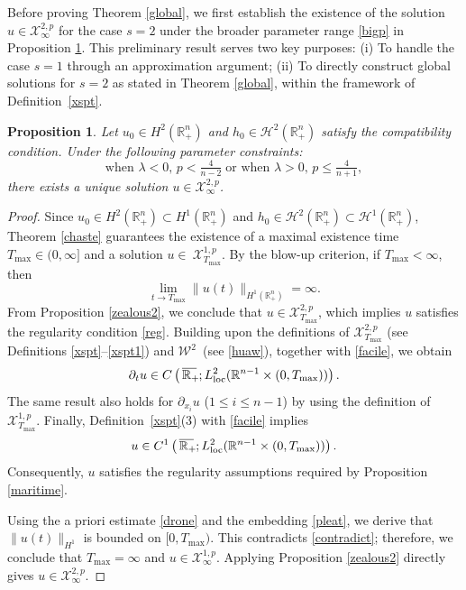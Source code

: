 \documentclass[preprint,compress,12pt]{elsarticle}
\newtheorem{proposition}[theorem]{Proposition}
\numberwithin{equation}{section}
\begin{document}
Before proving Theorem \ref{global}, we first establish the existence of the solution $u \in \mathscr{X}^{2,p}_\infty$ for the case $s=2$ under the broader parameter range \eqref{bigp} in Proposition \ref{ag}. This preliminary result serves two key purposes:
(i) To handle the case $s=1$ through an approximation argument;
(ii) To directly construct global solutions for $s=2$ as stated in Theorem \ref{global}, within the framework of Definition~\ref{xspt}.
\begin{proposition}\label{ag}
	Let $u_{0}\in H^{2}(\mathbb{R}_{+}^{n})$ and  $h_{0}\in\mathcal{H}^{2}(\mathbb{R}_{+}^{n})$
	satisfy the compatibility condition. Under the following parameter constraints:
	\begin{equation}\label{bigp}
		\text{when $\lambda<0$, $p<\tfrac{4}{n-2}$}\;\text{or when $\lambda>0$,  $p\leq \tfrac{4}{n+1}$},
	\end{equation}
	there exists a unique solution $u\in\mathscr{X}^{2,p}_{\infty}$.
\end{proposition}
\begin{proof}
	Since $u_{0} \in H^{2}(\mathbb{R}_{+}^{n}) \subset H^{1}(\mathbb{R}_{+}^{n})$ and $h_{0} \in \mathcal{H}^{2}(\mathbb{R}_{+}^{n}) \subset \mathcal{H}^{1}(\mathbb{R}_{+}^{n})$, Theorem \ref{chaste} guarantees the existence of a maximal existence time $T_{\max} \in (0,\infty]$ and a solution $u\in~\mathscr{X}^{1,p}_{T_{\max}}$. By the blow-up criterion,  if $T_{\max} < \infty$, then
	\begin{equation}\label{contradict}
		\lim_{t \to T_{\max}} \|u(t)\|_{H^{1}(\mathbb{R}^n_+)} = \infty.
	\end{equation}
	From Proposition \ref{zealous2}, we conclude that $u \in \mathscr{X}^{2,p}_{T_{\max}}$, which implies $u$ satisfies the regularity condition \eqref{reg}. Building upon the definitions of $\mathscr{X}^{2,p}_{T_{\max}}$ (see Definitions \ref{xspt}--\ref{xspt1}) and $\mathcal{W}^{2}$~(see \eqref{huaw}), together with \eqref{facile}, we obtain \[\partial_{t}u\in C\left(\,\overline{\mathbb{R}_{+}\mkern-4mu}\,;L_{\mathrm{loc}}^{2}(\mathbb{R}^{n-1}\times (0, T_{\max}) )\right).\]
	The same result also holds for $\partial_{x_{i}}u$ ($1\leq i\leq n-1$) by using the definition of $\mathscr{X}^{1,p}_{T_{\max}}$. Finally, Definition~\ref{xspt}(3) with \eqref{facile} implies
	\[u\in C^{1}\left(\,\overline{\mathbb{R}_{+}\mkern-4mu}\,;L^{2}_{\mathrm{loc}}(\mathbb{R}^{n-1}\times (0,T_{\max}))\right).\]
	Consequently, $u$ satisfies the regularity assumptions required by Proposition \ref{maritime}.
	
	Using the a priori estimate \eqref{drone} and the embedding \eqref{pleat}, we derive that $\|u(t)\|_{H^{1}}$ is bounded on $[0,T_{\max})$.  This contradicts \eqref{contradict}; therefore, we conclude that $T_{\max}=\infty$ and $u\in \mathscr{X}^{1,p}_{\infty}$. Applying Proposition \ref{zealous2} directly gives $u\in \mathscr{X}^{2,p}_{\infty}$.
\end{proof}
\end{document}
